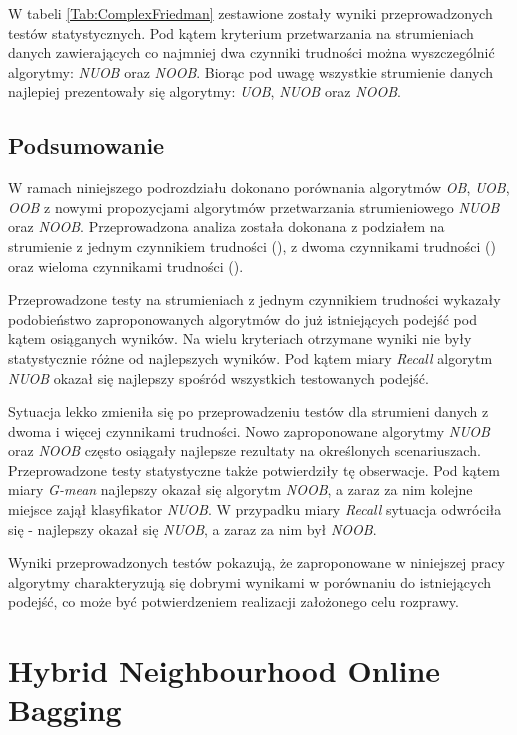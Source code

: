 \noindent W tabeli \ref{Tab:ComplexFriedman} zestawione zostały wyniki przeprowadzonych testów statystycznych. Pod kątem kryterium przetwarzania na strumieniach danych zawierających co najmniej dwa czynniki trudności można wyszczególnić algorytmy: \textit{NUOB} oraz \textit{NOOB}. Biorąc pod uwagę wszystkie strumienie danych najlepiej prezentowały się algorytmy: \textit{UOB}, \textit{NUOB} oraz \textit{NOOB}.

\subsection{Podsumowanie}

\noindent W ramach niniejszego podrozdziału dokonano porównania algorytmów \textit{OB}, \textit{UOB}, \textit{OOB} z nowymi propozycjami algorytmów przetwarzania strumieniowego \textit{NUOB} oraz \textit{NOOB}. Przeprowadzona analiza została dokonana z podziałem na strumienie z jednym czynnikiem trudności (), z dwoma czynnikami trudności () oraz wieloma czynnikami trudności ().

Przeprowadzone testy na strumieniach z jednym czynnikiem trudności wykazały podobieństwo zaproponowanych algorytmów do już istniejących podejść pod kątem osiąganych wyników. Na wielu kryteriach otrzymane wyniki nie były statystycznie różne od najlepszych wyników. Pod kątem miary \textit{Recall} algorytm \textit{NUOB} okazał się najlepszy spośród wszystkich testowanych podejść.

Sytuacja lekko zmieniła się po przeprowadzeniu testów dla strumieni danych z dwoma i więcej czynnikami trudności. Nowo zaproponowane algorytmy \textit{NUOB} oraz \textit{NOOB} często osiągały najlepsze rezultaty na określonych scenariuszach. Przeprowadzone testy statystyczne także potwierdziły tę obserwacje. Pod kątem miary \textit{G-mean} najlepszy okazał się algorytm \textit{NOOB}, a zaraz za nim kolejne miejsce zajął klasyfikator \textit{NUOB}. W przypadku miary \textit{Recall} sytuacja odwróciła się - najlepszy okazał się \textit{NUOB}, a zaraz za nim był \textit{NOOB}.

Wyniki przeprowadzonych testów pokazują, że zaproponowane w niniejszej pracy algorytmy charakteryzują się dobrymi wynikami w porównaniu do istniejących podejść, co może być potwierdzeniem realizacji założonego celu rozprawy.

\section{Hybrid Neighbourhood Online Bagging}

